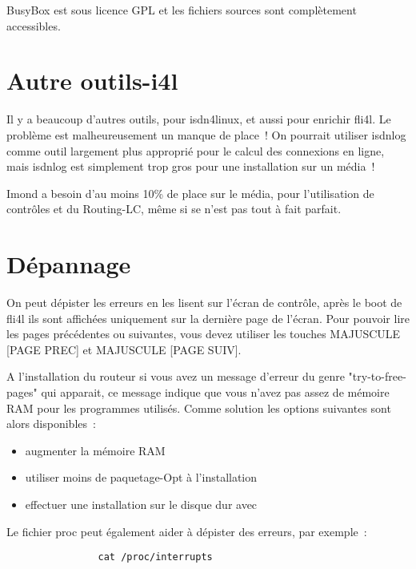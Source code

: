     BusyBox est sous licence GPL et les fichiers sources sont complètement
    accessibles.



    \section{Autre outils-i4l}

    Il y a beaucoup d'autres outils, pour isdn4linux, et aussi pour enrichir
    fli4l. Le problème est malheureusement un manque de place~! On pourrait
    utiliser isdnlog comme outil largement plus approprié pour le calcul
    des connexions en ligne, mais isdnlog est simplement trop gros pour une
    installation sur un média~!

    Imond a besoin d'au moins 10\% de place sur le média, pour
    l'utilisation de contrôles et du Routing-LC, même si se n'est
    pas tout à fait parfait.


    \section{Dépannage}

    On peut dépister les erreurs en les lisent sur l'écran de contrôle,
    après le boot de fli4l ils sont affichées uniquement sur la dernière page
    de l'écran. Pour pouvoir lire les pages précédentes ou suivantes, vous devez
    utiliser les touches MAJUSCULE [PAGE PREC] et MAJUSCULE [PAGE SUIV].

    A l'installation du routeur si vous avez un message d'erreur du genre
    "try-to-free-pages" qui apparait, ce message indique que vous n'avez pas
    assez de mémoire RAM pour les programmes utilisés. Comme solution les
    options suivantes sont alors disponibles~:
    \begin{itemize}
    \item augmenter la mémoire RAM
    \item utiliser moins de paquetage-Opt à l'installation
    \item effectuer une installation sur le disque dur avec 
    \end{itemize}

    Le fichier proc peut également aider à dépister des erreurs, par exemple~:

\begin{example}
\begin{verbatim}
                cat /proc/interrupts
\end{verbatim}
\end{example}

